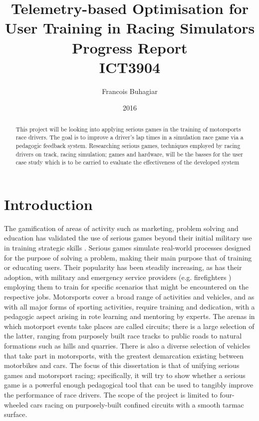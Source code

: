 \documentclass{article}
\title{Telemetry-based Optimisation for User Training in Racing Simulators \\ Progress Report \\ 
ICT3904}
\author{Francois Buhagiar}
\date{2016}
\begin{document}

\maketitle
\newpage
\tableofcontents

\setcounter{page}{1}

\newpage
\begin{abstract}
This project will be looking into applying serious games in the training of motorsports race drivers. The goal is to improve a driver's lap times in a simulation race game via a pedagogic feedback system. Researching serious games, techniques employed by racing drivers on track, racing simulation; games and hardware, will be the basses for the user case study which is to be carried to evaluate the effectiveness of the developed system
\end{abstract}

\newpage
\section{Introduction}
The gamification of areas of activity such as marketing, problem solving and education \cite{michael2005serious} has validated the use of serious games beyond their initial military use in training strategic skills \cite{djaouti2011classifying}.  Serious games simulate real-world processes designed for the purpose of solving a problem, making their main purpose that of training or educating users. Their popularity has been steadily increasing, as has their adoption, with military \cite{djaouti2011classifying} and emergency service providers (e.g. firefighters \cite{michael2005serious}) employing them to train for specific scenarios that might be encountered on the respective jobs. Motorsports cover a broad range of activities and vehicles, and as with all major forms of sporting activities, require training and dedication, with a pedagogic aspect arising in rote learning and mentoring by experts. The arenas in which motorport events take places are called circuits; there is a large selection of the latter, ranging from purposely built race tracks to public roads to natural formations such as hills and quarries. There is also a diverse selection of vehicles that take part in motorsports, with the greatest demarcation existing between motorbikes and cars. The focus of this dissertation is that of unifying serious games and motorsport racing; specifically, it will try to show whether a serious game is a powerful enough pedagogical tool that can be used to tangibly improve the performance of race drivers. The scope of the project is limited to four-wheeled cars racing on purposely-built confined circuits with a smooth tarmac surface.  
\end{document}
